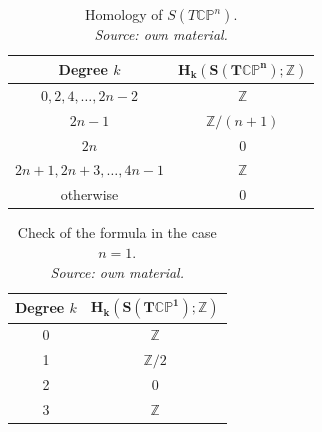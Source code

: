 \documentclass[12pt,a4paper]{article}
\theoremstyle{notespace}
\begin{document}
\begin{table}[htbp]
	\centering
	\small
	\caption{Homology of \(S(T\mathbb{CP}^n)\).\\
		\textit{Source: own material.}}
	\label{tab:homology-stcpn}
	\begin{tabular}{c|c}
		\toprule
		\textbf{Degree \(k\)} & \(\mathbf{H_k(S(T\mathbb{CP}^n);\mathbb Z)}\) \\
		\midrule
		\(0,2,4,\dots,2n-2\) & \(\mathbb Z\) \\
		\(2n-1\) & \(\mathbb Z/(n+1)\) \\
		\(2n\) & \(0\) \\
		\(2n+1,2n+3,\dots,4n-1\) & \(\mathbb Z\) \\
		otherwise & \(0\) \\
		\bottomrule
	\end{tabular}
\end{table}

\begin{table}[htbp]
	\centering
	\small
	\caption{Check of the formula in the case \(n=1\).\\
		\textit{Source: own material.}}
	\label{tab:n1-check}
	\begin{tabular}{c|c}
		\toprule
		\textbf{Degree \(k\)} & \(\mathbf{H_k(S(T\mathbb{CP}^1);\mathbb Z)}\) \\
		\midrule
		0 & \(\mathbb Z\) \\
		1 & \(\mathbb Z/2\) \\
		2 & \(0\) \\
		3 & \(\mathbb Z\) \\
		\bottomrule
	\end{tabular}
\end{table}
\end{document}
